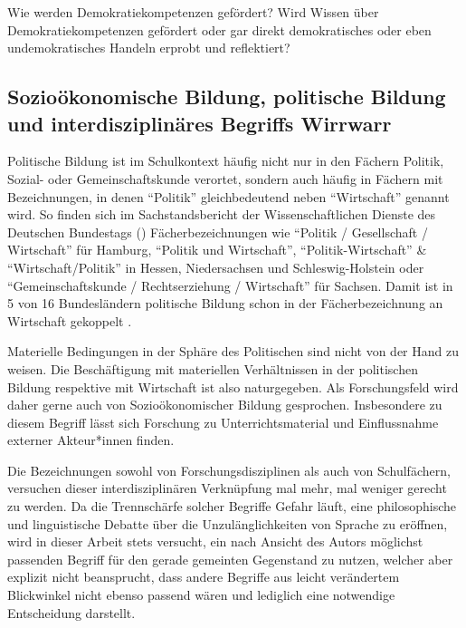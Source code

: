 
Wie werden Demokratiekompetenzen gefördert? Wird Wissen über Demokratiekompetenzen gefördert oder gar direkt demokratisches oder eben undemokratisches Handeln erprobt und reflektiert?


\subsection{Sozioökonomische Bildung, politische Bildung und interdisziplinäres Begriffs Wirrwarr \label{polBildung}}

Politische Bildung %
ist im Schulkontext häufig nicht nur in den Fächern Politik, Sozial- oder Gemeinschaftskunde verortet, sondern auch häufig in Fächern mit Bezeichnungen, in denen \enquote{Politik} gleichbedeutend neben \enquote{Wirtschaft} genannt wird. 
So finden sich im Sachstandsbericht der Wissenschaftlichen Dienste des Deutschen Bundestags (\citeyear[5]{WD8.2016}) Fächerbezeichnungen wie \enquote{Politik / Gesellschaft / Wirtschaft} für Hamburg, \enquote{Politik und Wirtschaft}, \enquote{Politik-Wirtschaft} \& \enquote{Wirtschaft/Politik} in Hessen, Niedersachsen und Schleswig-Holstein oder \enquote{Gemeinschaftskunde / Rechtserziehung / Wirtschaft} für Sachsen. Damit ist in 5 von 16 Bundesländern politische Bildung schon in der Fächerbezeichnung an Wirtschaft gekoppelt \autocite[vgl. zu der tatsächlichen Zeit, die für politische Bildung im Unterricht an allgemeinbildenden Schulen zur Verfügung steht auch][14 \& 16]{Gokbudak2020}.

Materielle Bedingungen in der Sphäre des Politischen sind nicht von der Hand zu weisen. Die Beschäftigung mit materiellen Verhältnissen in der politischen Bildung respektive mit Wirtschaft ist also naturgegeben.
Als Forschungsfeld wird daher gerne auch von Sozioökonomischer Bildung gesprochen.
Insbesondere zu diesem Begriff lässt sich Forschung zu Unterrichtsmaterial und Einflussnahme externer Akteur*innen finden.


Die Bezeichnungen sowohl von Forschungsdisziplinen als auch von Schulfächern, versuchen dieser interdisziplinären Verknüpfung mal mehr, mal weniger gerecht zu werden.
Da die Trennschärfe solcher Begriffe Gefahr läuft, eine philosophische und linguistische Debatte über die Unzulänglichkeiten von Sprache zu eröffnen, wird in dieser Arbeit stets versucht, ein nach Ansicht des Autors möglichst passenden Begriff für den gerade gemeinten Gegenstand zu nutzen, welcher aber explizit nicht beansprucht, dass andere Begriffe aus leicht verändertem Blickwinkel nicht ebenso passend wären und lediglich eine notwendige Entscheidung darstellt. 

